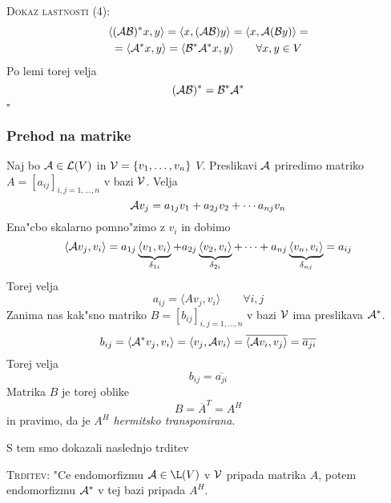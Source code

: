 \textsc{Dokaz lastnosti (4):}
\begin{multline*}
\langle (\mathcal{A} \mathcal{B})^* x, y \rangle = \langle x, (\mathcal{A} \mathcal{B}) y \rangle = \langle x, \mathcal{A} (\mathcal{B} y) \rangle = \\
= \langle \mathcal{A}^* x, y \rangle = \langle \mathcal{B}^* \mathcal{A}^* x, y \rangle \qquad \forall x, y \in V
\end{multline*}
Po lemi torej velja
\begin{equation*}
(\mathcal{A} \mathcal{B})^* = \mathcal{B}^* \mathcal{A}^*
\end{equation*}
\hfill $\square$

\subsubsection{Prehod na matrike}
Naj bo $\mathcal{A} \in \mathcal{L}(V)$ in $\mathcal{V} = \{ v_1, \ldots, v_n \}$ \ONB $V$. Preslikavi $\mathcal{A}$ priredimo matriko $A = [a_{ij}]_{i, j = 1, \ldots, n}$ v bazi $\mathcal{V}$. Velja
\begin{equation*}
\mathcal{A} v_j = a_{1j} v_1 + a_{2j} v_2 + \cdots a_{nj} v_n
\end{equation*}
Ena"cbo skalarno pomno"zimo z $v_i$ in dobimo
\begin{equation*}
\langle \mathcal{A} v_j, v_i \rangle = a_{1j} \underbrace{\langle v_1, v_i \rangle}_{\delta_{1i}} + a_{2j} \underbrace{\langle v_2, v_i \rangle}_{\delta_{2i}} + \cdots + a_{nj} \underbrace{\langle v_n, v_i \rangle}_{\delta_{nj}} = a_{ij}
\end{equation*}
Torej velja
\begin{equation*}
a_{ij} = \langle A v_j, v_i \rangle \qquad \forall i, j
\end{equation*}
Zanima nas kak"sno matriko $B = [b_{ij}]_{i, j = 1, \ldots, n}$ v bazi $\mathcal{V}$ ima preslikava $\mathcal{A}^*$.
\begin{equation*}
b_{ij} = \langle \mathcal{A}^* v_j, v_i \rangle = \langle v_j, \mathcal{A} v_i \rangle = \overline{\langle \mathcal{A} v_i, v_j \rangle} = \overline{a_{ji}}
\end{equation*}
Torej velja
\begin{equation*}
b_{ij} = \overline{a_{ji}}
\end{equation*}
Matrika $B$ je torej oblike
\begin{equation*}
B = \overline{A}^T = A^H
\end{equation*}
in pravimo, da je $A^H$ \emph{hermitsko transponirana}.

S tem smo dokazali naslednjo trditev

\textsc{Trditev:} "Ce endomorfizmu $\A\in \L(V)$ v \ONB $\mathcal{V}$ pripada matrika $A$, potem endomorfizmu $\mathcal{A}^*$ v tej bazi pripada $A^H$.

